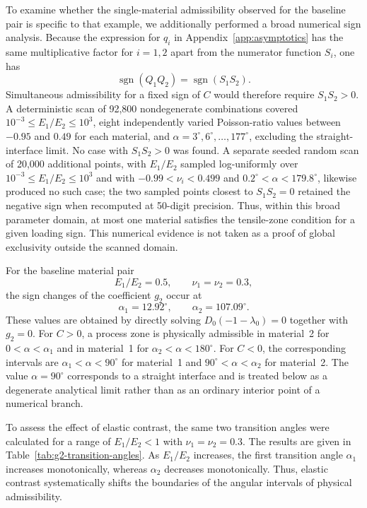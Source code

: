 \documentclass[pdflatex,onecolumn,sn-mathphys-ay]{sn-jnl}
\begin{document}
To examine whether the single-material admissibility observed for the
baseline pair is specific to that example, we additionally performed a broad
numerical sign analysis. Because the expression for $q_i$ in
Appendix~\ref{app:asymptotics} has the same multiplicative factor for
$i=1,2$ apart from the numerator function $S_i$, one has
\begin{equation*}
  \operatorname{sgn}(Q_1Q_2)
  =\operatorname{sgn}(S_1S_2).
\end{equation*}
Simultaneous admissibility for a fixed sign of $C$ would therefore require
$S_1S_2>0$. A deterministic scan of 92,800 nondegenerate combinations covered
$10^{-3}\le E_1/E_2\le10^3$, eight independently varied Poisson-ratio values
between $-0.95$ and $0.49$ for each material, and
$\alpha=3^\circ,6^\circ,\ldots,177^\circ$, excluding the straight-interface
limit. No case with $S_1S_2>0$ was found. A separate seeded random scan of
20,000 additional points, with $E_1/E_2$ sampled log-uniformly over
$10^{-3}\le E_1/E_2\le10^3$ and with
$-0.99<\nu_i<0.499$ and
$0.2^\circ<\alpha<179.8^\circ$, likewise produced no such case; the two
sampled points closest to $S_1S_2=0$ retained the negative sign when
recomputed at 50-digit precision. Thus, within this broad parameter domain,
at most one material satisfies the tensile-zone condition for a given
loading sign. This numerical evidence is not taken as a proof of global
exclusivity outside the scanned domain.

For the baseline material pair
\begin{equation*}
  E_1/E_2=0.5,\qquad \nu_1=\nu_2=0.3,
\end{equation*}
the sign changes of the coefficient $g_2$ occur at
\begin{equation*}
  \alpha_1=12.92^\circ,\qquad
  \alpha_2=107.09^\circ.
\end{equation*}
These values are obtained by directly solving
$D_0(-1-\lambda_0)=0$ together with $g_2=0$. For $C>0$, a process zone
is physically admissible in material~2 for $0<\alpha<\alpha_1$ and in
material~1 for $\alpha_2<\alpha<180^\circ$. For $C<0$, the corresponding
intervals are $\alpha_1<\alpha<90^\circ$ for material~1 and
$90^\circ<\alpha<\alpha_2$ for material~2. The value
$\alpha=90^\circ$ corresponds to a straight interface and is treated
below as a degenerate analytical limit rather than as an ordinary
interior point of a numerical branch.

To assess the effect of elastic contrast, the same two transition angles
were calculated for a range of $E_1/E_2<1$ with
$\nu_1=\nu_2=0.3$. The results are given in
Table~\ref{tab:g2-transition-angles}. As $E_1/E_2$ increases, the first
transition angle $\alpha_1$ increases monotonically, whereas $\alpha_2$
decreases monotonically. Thus, elastic contrast systematically shifts
the boundaries of the angular intervals of physical admissibility.
\end{document}
